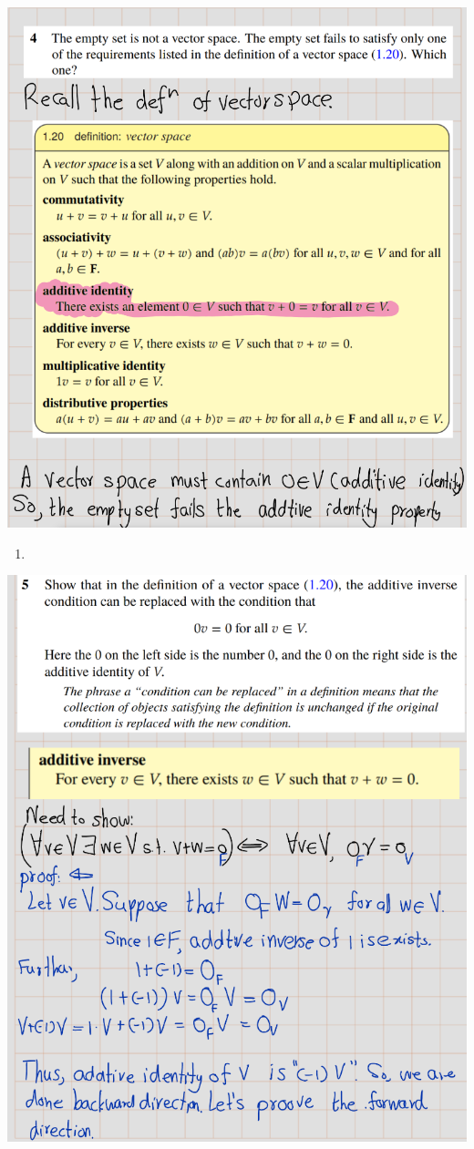 \documentclass[
]{book}
\providecommand{\tightlist}{%
  \setlength{\itemsep}{0pt}\setlength{\parskip}{0pt}}
\theoremstyle{definition}
\theoremstyle{definition}
\theoremstyle{definition}
\theoremstyle{definition}
\theoremstyle{remark}
\begin{document}
\includegraphics[width=10.51in]{fig/Ex1B/Ex4}

\begin{enumerate}
\def\labelenumi{\arabic{enumi}.}
\setcounter{enumi}{4}
\tightlist
\item
\end{enumerate}

\includegraphics[width=9.54in]{fig/Ex1B/Ex5-1}
\end{document}
